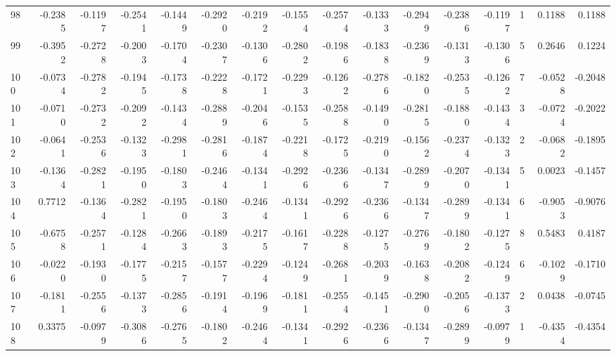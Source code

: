 \begin{tabular}{lrrrrrrrrrrrrrrr}
98  &     -0.2385 & -0.1197 & -0.2541 & -0.1449 & -0.2920 & -0.2192 & -0.1554 & -0.2574 & -0.1333 & -0.2949 &  -0.2386 &    -0.1197 &      1 &                    0.1188 &                     0.1188 \\
99  &     -0.3952 & -0.2728 & -0.2003 & -0.1704 & -0.2307 & -0.1306 & -0.2802 & -0.1986 & -0.1838 & -0.2369 &  -0.1313 &    -0.1306 &      5 &                    0.2646 &                     0.1224 \\
100 &     -0.0734 & -0.2782 & -0.1945 & -0.1738 & -0.2228 & -0.1721 & -0.2293 & -0.1262 & -0.2786 & -0.1820 &  -0.2535 &    -0.1262 &      7 &                   -0.0528 &                    -0.2048 \\
101 &     -0.0710 & -0.2732 & -0.2092 & -0.1434 & -0.2889 & -0.2046 & -0.1535 & -0.2588 & -0.1490 & -0.2815 &  -0.1880 &    -0.1434 &      3 &                   -0.0724 &                    -0.2022 \\
102 &     -0.0641 & -0.2536 & -0.1323 & -0.2981 & -0.2816 & -0.1874 & -0.2218 & -0.1725 & -0.2190 & -0.1562 &  -0.2374 &    -0.1323 &      2 &                   -0.0682 &                    -0.1895 \\
103 &     -0.1364 & -0.2821 & -0.1950 & -0.1803 & -0.2464 & -0.1341 & -0.2926 & -0.2366 & -0.1347 & -0.2899 &  -0.2070 &    -0.1341 &      5 &                    0.0023 &                    -0.1457 \\
104 &      0.7712 & -0.1364 & -0.2821 & -0.1950 & -0.1803 & -0.2464 & -0.1341 & -0.2926 & -0.2366 & -0.1347 &  -0.2899 &    -0.1341 &      6 &                   -0.9053 &                    -0.9076 \\
105 &     -0.6758 & -0.2571 & -0.1284 & -0.2663 & -0.1893 & -0.2175 & -0.1617 & -0.2288 & -0.1275 & -0.2769 &  -0.1802 &    -0.1275 &      8 &                    0.5483 &                     0.4187 \\
106 &     -0.0220 & -0.1930 & -0.1775 & -0.2157 & -0.1577 & -0.2294 & -0.1249 & -0.2681 & -0.2039 & -0.1638 &  -0.2082 &    -0.1249 &      6 &                   -0.1029 &                    -0.1710 \\
107 &     -0.1811 & -0.2556 & -0.1373 & -0.2856 & -0.1914 & -0.1969 & -0.1811 & -0.2554 & -0.1451 & -0.2900 &  -0.2056 &    -0.1373 &      2 &                    0.0438 &                    -0.0745 \\
108 &      0.3375 & -0.0979 & -0.3086 & -0.2765 & -0.1802 & -0.2464 & -0.1341 & -0.2926 & -0.2366 & -0.1347 &  -0.2899 &    -0.0979 &      1 &                   -0.4354 &                    -0.4354 \\

\end{tabular}
